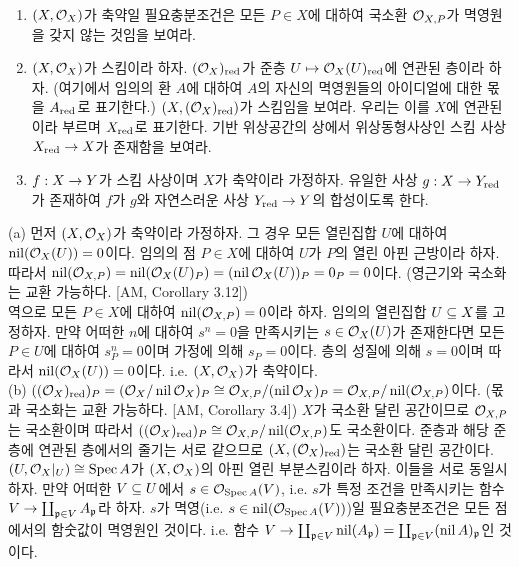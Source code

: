 \begin{enumerate}[label=\tb{2.\arabic*.},itemindent=0mm,itemsep=4mm]
	\begin{enumerate}[label=(\alph*)]
	\item $(X,\mathcal{O}_X)$가 축약일 필요충분조건은 모든 $P\in X$에 대하여 국소환 $\mathcal{O}_{X,P}$가 멱영원을 갖지 않는 것임을 보여라.
	\item $(X,\mathcal{O}_X)$가 스킴이라 하자. $(\mathcal{O}_X)_{\mathrm{red}}$가 준층 $U\mapsto\mathcal{O}_X(U)_{\mathrm{red}}$에 연관된 층이라 하자.
	(여기에서 임의의 환 $A$에 대하여 $A$의 자신의 멱영원들의 아이디얼에 대한 몫을 $A_{\mathrm{red}}$로 표기한다.)
	$(X,(\mathcal{O}_X)_{\mathrm{red}})$가 스킴임을 보여라.
	우리는 이를 $X$에 연관된 이라 부르며 $X_{\mathrm{red}}$로 표기한다.
	기반 위상공간의 상에서 위상동형사상인 스킴 사상 $X_{\mathrm{red}}\rightarrow X$가 존재함을 보여라.
	\item $f:X\rightarrow Y$가 스킴 사상이며 $X$가 축약이라 가정하자.
	유일한 사상 $g:X\rightarrow Y_{\mathrm{red}}$가 존재하여 $f$가 $g$와 자연스러운 사상 $Y_{\mathrm{red}}\rightarrow Y$의 합성이도록 한다.
	\end{enumerate}
	\sol (a) 먼저 $(X,\mathcal{O}_X)$가 축약이라 가정하자. 그 경우 모든 열린집합 $U$에 대하여 $\operatorname{nil}(\mathcal{O}_X(U))=0$이다.
	임의의 점 $P\in X$에 대하여 $U$가 $P$의 열린 아핀 근방이라 하자.
	따라서 $\operatorname{nil}(\mathcal{O}_{X,P})=\operatorname{nil}(\mathcal{O}_X(U)_P)=(\operatorname{nil}\mathcal{O}_X(U))_P=0_P=0$이다.
	(영근기와 국소화는 교환 가능하다. [AM, Corollary 3.12])\\
	역으로 모든 $P\in X$에 대하여 $\operatorname{nil}(\mathcal{O}_{X,P})=0$이라 하자. 임의의 열린집합 $U\subseteq X$를 고정하자.
	만약 어떠한 $n$에 대하여 $s^n=0$을 만족시키는 $s\in\mathcal{O}_X(U)$가 존재한다면
	모든 $P\in U$에 대하여 $s_P^n=0$이며 가정에 의해 $s_P=0$이다.
	층의 성질에 의해 $s=0$이며 따라서 $\operatorname{nil}(\mathcal{O}_X(U))=0$이다. i.e. $(X,\mathcal{O}_X)$가 축약이다.\\
	(b) $((\mathcal{O}_X)_{\mathrm{red}})_P=(\mathcal{O}_X/\operatorname{nil}\mathcal{O}_X)_P\cong\mathcal{O}_{X,P}/(\operatorname{nil}\mathcal{O}_X)_P=\mathcal{O}_{X,P}/\operatorname{nil}(\mathcal{O}_{X,P})$이다.
	(몫과 국소화는 교환 가능하다. [AM, Corollary 3.4]) $X$가 국소환 달린 공간이므로 $\mathcal{O}_{X,P}$는 국소환이며
	따라서 $((\mathcal{O}_X)_{\mathrm{red}})_P\cong\mathcal{O}_{X,P}/\operatorname{nil}(\mathcal{O}_{X,P})$도 국소환이다.
	준층과 해당 준층에 연관된 층에서의 줄기는 서로 같으므로 $(X,(\mathcal{O}_X)_{\mathrm{red}})$는 국소환 달린 공간이다.\\
	$(U,\mathcal{O}_X|_U)\cong\operatorname{Spec} A$가 $(X,\mathcal{O}_X)$의 아핀 열린 부분스킴이라 하자. 이들을 서로 동일시하자.
	만약 어떠한 $V\subseteq U$에서 $s\in\mathcal{O}_{\operatorname{Spec} A}(V)$, i.e. $s$가 특정 조건을 만족시키는 함수
	$V\rightarrow\coprod_{\mathfrak{p}\in V}A_{\mathfrak{p}}$라 하자.
	$s$가 멱영(i.e. $s\in\operatorname{nil}(\mathcal{O}_{\operatorname{Spec} A}(V))$)일 필요충분조건은 모든 점에서의 함숫값이 멱영원인 것이다.
	i.e. 함수 $V\rightarrow\coprod_{\mathfrak{p}\in V}\operatorname{nil}(A_{\mathfrak{p}})=\coprod_{\mathfrak{p}\in V}(\operatorname{nil} A)_{\mathfrak{p}}$인 것이다.

\end{enumerate}
